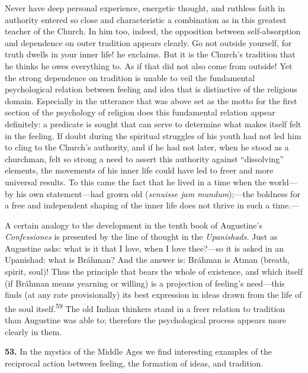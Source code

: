 \documentclass[12pt,a4paper]{book}
\newcommand{\opage}[1]{\marginnote{\footnotesize\textit{[#1]}}}
\begin{document}
Never have deep personal experience, energetic thought, and ruthless faith in authority entered
so close and characteristic a combination as in this greatest teacher of the Church. In him too,
indeed, the opposition between self-absorption and dependence on outer tradition appears clearly.
Go not outside yourself, for truth dwells in your inner life! he exclaims. But it is the Church's
tradition that he thinks he owes everything to. As if that did not also come from outside! Yet
the strong dependence on tradition is unable to veil the fundamental psychological relation
between feeling and idea that is distinctive of the religious domain. Especially in the utterance
that was above set as the motto for the first section of the psychology of religion does this
fundamental relation appear definitely: a predicate is sought that can serve to determine what
makes itself felt in the feeling. If doubt during the spiritual struggles of his youth had not
led him to cling to the Church's authority, and if he had not later, when he stood as a churchman,
felt so strong a need to assert this authority against ``dissolving'' elements, the movements of
his inner life could have led to freer and more universal results. To this came the fact that he
lived in a time when the world---by his own statement---had grown old (\textit{senuisse jam
mundum});---the boldness for a free and independent shaping of the inner life does not thrive in
such a time.---

A certain analogy to the development in the tenth book of Augustine's \emph{Confessiones} is
presented by the line of thought in the \emph{Upanishads.} Just as Augustine asks: what is it that
I love, when I love thee?---so it is asked in an Upanishad: what is Bráhman? And the answer is:
Bráhman is Atman (breath, spirit, soul)! Thus the principle that bears the whole of existence, and
which itself (if Bráhman 
\opage{117}means yearning or willing) is a projection of feeling's need---this finds
(at any rate provisionally) its best expression in ideas drawn from the life of the soul
itself.\textsuperscript{59} The old Indian thinkers stand in a freer relation to tradition than
Augustine was able to; therefore the psychological process appears more clearly in them.

\medskip

\noindent\textbf{53.} In the mystics of the Middle Ages we find interesting examples of the
reciprocal action between feeling, the formation of ideas, and tradition.
\end{document}
